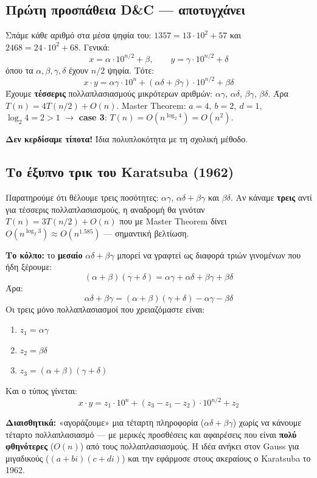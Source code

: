 \documentclass[11pt,a4paper]{article}
\begin{document}
\subsection{Πρώτη προσπάθεια D\&C --- αποτυγχάνει}

Σπάμε κάθε αριθμό στα μέσα ψηφία του: $1357 = 13 \cdot 10^2 + 57$ και
$2468 = 24 \cdot 10^2 + 68$. Γενικά:
\[
x = \alpha \cdot 10^{n/2} + \beta, \qquad y = \gamma \cdot 10^{n/2} + \delta
\]
όπου τα $\alpha, \beta, \gamma, \delta$ έχουν $n/2$ ψηφία. Τότε:
\[
x \cdot y = \alpha \gamma \cdot 10^n + (\alpha \delta + \beta \gamma) \cdot
10^{n/2} + \beta \delta
\]
Έχουμε \textbf{τέσσερις} πολλαπλασιασμούς μικρότερων αριθμών: $\alpha\gamma$,
$\alpha\delta$, $\beta\gamma$, $\beta\delta$. Άρα $T(n) = 4 T(n/2) + O(n)$.
Master Theorem: $a = 4,\ b = 2,\ d = 1$, $\log_2 4 = 2 > 1$ $\to$ \textbf{case
3}: $T(n) = O(n^{\log_2 4}) = O(n^2)$.

\textbf{Δεν κερδίσαμε τίποτα!} Ίδια πολυπλοκότητα με τη σχολική μέθοδο.

\subsection{Το έξυπνο τρικ του Karatsuba (1962)}

Παρατηρούμε ότι θέλουμε τρεις ποσότητες: $\alpha\gamma$, $\alpha\delta +
\beta\gamma$ και $\beta\delta$. Αν κάναμε \textbf{τρεις} αντί για τέσσερις
πολλαπλασιασμούς, η αναδρομή θα γινόταν $T(n) = 3T(n/2) + O(n)$ που με Master
Theorem δίνει $O(n^{\log_2 3}) \approx O(n^{1.585})$ --- σημαντική βελτίωση.

\textbf{Το κόλπο:} το \textbf{μεσαίο} $\alpha \delta + \beta \gamma$ μπορεί να
γραφτεί ως διαφορά τριών γινομένων που ήδη ξέρουμε:
\[
(\alpha + \beta)(\gamma + \delta) = \alpha \gamma + \alpha \delta + \beta \gamma
+ \beta \delta
\]
Άρα:
\[
\alpha \delta + \beta \gamma = (\alpha + \beta)(\gamma + \delta) - \alpha \gamma
- \beta \delta
\]
Οι τρεις μόνο πολλαπλασιασμοί που χρειαζόμαστε είναι:
\begin{enumerate}
  \item $z_1 = \alpha \gamma$
  \item $z_2 = \beta \delta$
  \item $z_3 = (\alpha + \beta)(\gamma + \delta)$
\end{enumerate}
Και ο τύπος γίνεται:
\[
x \cdot y = z_1 \cdot 10^n + (z_3 - z_1 - z_2) \cdot 10^{n/2} + z_2
\]

\begin{intuition}
\textbf{Διαισθητικά:} «αγοράζουμε» μια τέταρτη πληροφορία ($\alpha\delta +
\beta\gamma$) χωρίς να κάνουμε τέταρτο πολλαπλασιασμό --- με μερικές προσθέσεις
και αφαιρέσεις που είναι \textbf{πολύ φθηνότερες} ($O(n)$) από τους
πολλαπλασιασμούς. Η ιδέα ανήκει στον Gauss για μιγαδικούς ($(a+bi)(c+di)$) και
την εφάρμοσε στους ακεραίους ο Karatsuba το 1962.
\end{intuition}
\end{document}
